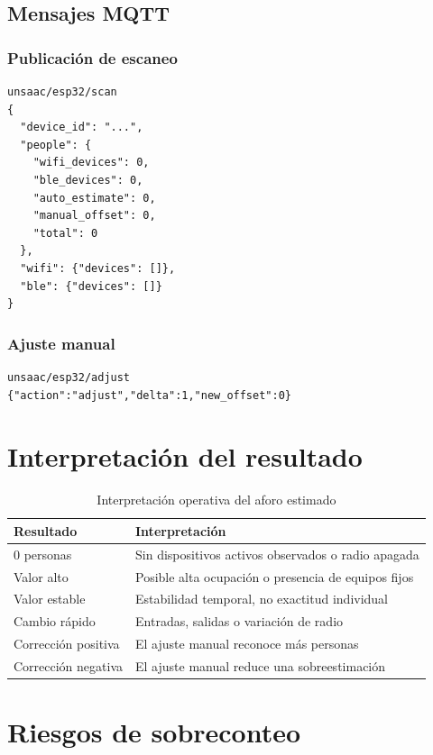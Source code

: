 \documentclass[12pt,a4paper]{article}
\begin{document}
\subsection{Mensajes MQTT}
\subsubsection{Publicación de escaneo}
\begin{verbatim}
unsaac/esp32/scan
{
  "device_id": "...",
  "people": {
    "wifi_devices": 0,
    "ble_devices": 0,
    "auto_estimate": 0,
    "manual_offset": 0,
    "total": 0
  },
  "wifi": {"devices": []},
  "ble": {"devices": []}
}
\end{verbatim}

\subsubsection{Ajuste manual}
\begin{verbatim}
unsaac/esp32/adjust
{"action":"adjust","delta":1,"new_offset":0}
\end{verbatim}

\section{Interpretación del resultado}
\begin{table}[htbp]
\centering
\centering
\caption{Interpretación operativa del aforo estimado}
\begin{tabularx}{\textwidth}{@{}p{3.2cm}X@{}}
\toprule
Resultado & Interpretación \\
\midrule
0 personas & Sin dispositivos activos observados o radio apagada \\
Valor alto & Posible alta ocupación o presencia de equipos fijos \\
Valor estable & Estabilidad temporal, no exactitud individual \\
Cambio rápido & Entradas, salidas o variación de radio \\
Corrección positiva & El ajuste manual reconoce más personas \\
Corrección negativa & El ajuste manual reduce una sobreestimación \\
\bottomrule
\end{tabularx}
\end{table}

\section{Riesgos de sobreconteo}
\end{document}
